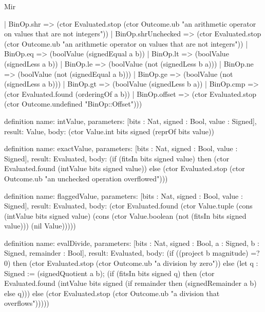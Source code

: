\begin{lexlean}{Mir}
\begin{semanticmodule}
{    | BinOp.shr => (ctor Evaluated.stop (ctor Outcome.ub "an arithmetic operator on values that are not integers"))
    | BinOp.shrUnchecked => (ctor Evaluated.stop (ctor Outcome.ub "an arithmetic operator on values that are not integers"))
    | BinOp.eq => (boolValue (signedEqual a b))
    | BinOp.lt => (boolValue (signedLess a b))
    | BinOp.le => (boolValue (not (signedLess b a)))
    | BinOp.ne => (boolValue (not (signedEqual a b)))
    | BinOp.ge => (boolValue (not (signedLess a b)))
    | BinOp.gt => (boolValue (signedLess b a))
    | BinOp.cmp => (ctor Evaluated.found (orderingOf a b))
    | BinOp.offset => (ctor Evaluated.stop (ctor Outcome.undefined "BinOp::Offset")))
}

definition{
  name: intValue,
  parameters: [bits : Nat, signed : Bool, value : Signed],
  result: Value,
  body: (ctor Value.int bits signed (reprOf bits value))
}

definition{
  name: exactValue,
  parameters: [bits : Nat, signed : Bool, value : Signed],
  result: Evaluated,
  body: (if (fitsIn bits signed value) then (ctor Evaluated.found (intValue bits signed value)) else (ctor Evaluated.stop (ctor Outcome.ub "an unchecked operation overflowed")))
}

definition{
  name: flaggedValue,
  parameters: [bits : Nat, signed : Bool, value : Signed],
  result: Evaluated,
  body: (ctor Evaluated.found (ctor Value.tuple (cons (intValue bits signed value) (cons (ctor Value.boolean (not (fitsIn bits signed value))) (nil Value)))))
}

definition{
  name: evalDivide,
  parameters: [bits : Nat, signed : Bool, a : Signed, b : Signed, remainder : Bool],
  result: Evaluated,
  body: (if ((project b magnitude) =? 0) then (ctor Evaluated.stop (ctor Outcome.ub "a division by zero")) else (let q : Signed := (signedQuotient a b); (if (fitsIn bits signed q) then (ctor Evaluated.found (intValue bits signed (if remainder then (signedRemainder a b) else q))) else (ctor Evaluated.stop (ctor Outcome.ub "a division that overflows")))))
}


\end{semanticmodule}
\end{lexlean}
